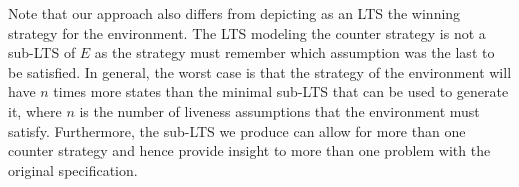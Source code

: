  Note that our approach also differs from depicting as an LTS the winning strategy for the environment. The LTS modeling the counter strategy is not a sub-LTS of $E$ as the strategy must remember which assumption was the last to be satisfied. In general, the worst case is that the strategy of the environment will have $n$ times more states than the minimal sub-LTS that can be used to generate it, where $n$ is the number of liveness assumptions that the environment must satisfy. Furthermore, the sub-LTS we produce can allow for more than one counter strategy and hence provide insight to more than one problem with the original specification. 
 








